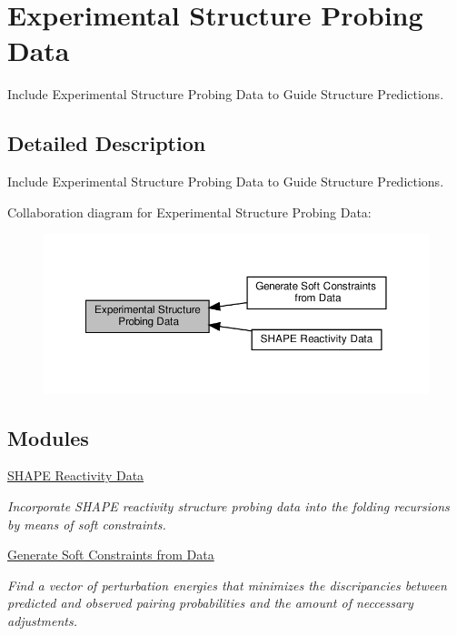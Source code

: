 \hypertarget{group__probing__data}{}\section{Experimental Structure Probing Data}
\label{group__probing__data}


Include Experimental Structure Probing Data to Guide Structure Predictions.  




\subsection{Detailed Description}
Include Experimental Structure Probing Data to Guide Structure Predictions. 

Collaboration diagram for Experimental Structure Probing Data\+:
\nopagebreak
\begin{figure}[H]
\begin{center}
\leavevmode
\includegraphics[width=350pt]{group__probing__data}
\end{center}
\end{figure}
\subsection*{Modules}
\begin{DoxyCompactItemize}
\item 
\hyperlink{group__SHAPE__reactivities}{S\+H\+A\+P\+E Reactivity Data}
\begin{DoxyCompactList}\small\item\em Incorporate S\+H\+A\+PE reactivity structure probing data into the folding recursions by means of soft constraints. \end{DoxyCompactList}\item 
\hyperlink{group__perturbation}{Generate Soft Constraints from Data}
\begin{DoxyCompactList}\small\item\em Find a vector of perturbation energies that minimizes the discripancies between predicted and observed pairing probabilities and the amount of neccessary adjustments. \end{DoxyCompactList}\end{DoxyCompactItemize}
